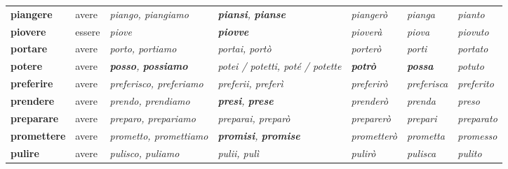 \documentclass[11pt,a4paper,twoside,openright]{book}
\newcommand{\irr}[1]{{\color{exccol}\bfseries #1}}
\begin{document}
{\begin{xltabular}{\linewidth}{@{}>{\raggedright\arraybackslash}p{2.7cm} l L L l >{\raggedright\arraybackslash}p{1.9cm} l@{}}
\textbf{piangere} & avere & \textit{piango, piangiamo} & \textit{\irr{piansi}, \irr{pianse}} & \textit{piangerò} & \textit{pianga} & \textit{pianto} \\
\textbf{piovere} & essere & \textit{piove} & \textit{\irr{piovve}} & \textit{pioverà} & \textit{piova} & \textit{piovuto} \\
\textbf{portare} & avere & \textit{porto, portiamo} & \textit{portai, portò} & \textit{porterò} & \textit{porti} & \textit{portato} \\
\textbf{potere} & avere & \textit{\irr{posso}, \irr{possiamo}} & \textit{potei / potetti, poté / potette} & \textit{\irr{potrò}} & \textit{\irr{possa}} & \textit{potuto} \\
\textbf{preferire} & avere & \textit{preferisco, preferiamo} & \textit{preferii, preferì} & \textit{preferirò} & \textit{preferisca} & \textit{preferito} \\
\textbf{prendere} & avere & \textit{prendo, prendiamo} & \textit{\irr{presi}, \irr{prese}} & \textit{prenderò} & \textit{prenda} & \textit{preso} \\
\textbf{preparare} & avere & \textit{preparo, prepariamo} & \textit{preparai, preparò} & \textit{preparerò} & \textit{prepari} & \textit{preparato} \\
\textbf{promettere} & avere & \textit{prometto, promettiamo} & \textit{\irr{promisi}, \irr{promise}} & \textit{prometterò} & \textit{prometta} & \textit{promesso} \\
\textbf{pulire} & avere & \textit{pulisco, puliamo} & \textit{pulii, pulì} & \textit{pulirò} & \textit{pulisca} & \textit{pulito} \\

\end{xltabular}}
\end{document}
